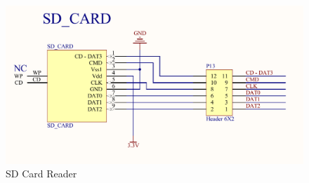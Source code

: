 \begin{figure}[h]
  \centering
  \includegraphics[width=\textwidth]{fig/pcb/schematics/pcbschematic_sdcard.pdf}
  \caption{SD Card Reader}
  \label{fig:schematic-pcb-sdcard}
\end{figure}

